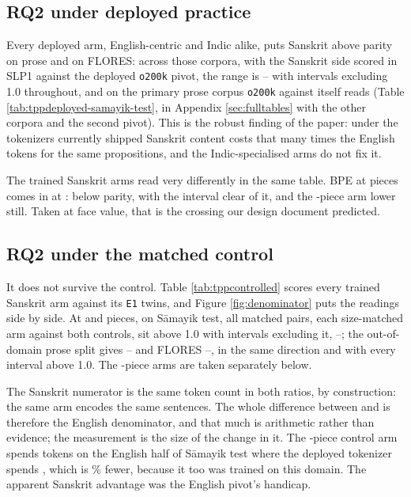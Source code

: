 \documentclass[11pt]{article}
\begin{document}
\subsection{RQ2 under deployed practice}
\label{sec:rq2-deployed}

Every deployed arm, English-centric and Indic alike, puts Sanskrit above parity on prose
and on FLORES: across those corpora, with the Sanskrit side scored in SLP1 against the
deployed \texttt{o200k} pivot, the range is \numDeployedLo--\numDeployedHi{} with intervals
excluding 1.0 throughout, and on the primary prose corpus \texttt{o200k} against itself
reads \numDeployedSamayikOTwoHundredK{} \numDeployedSamayikOTwoHundredKCi{}
(Table \ref{tab:tppdeployed-samayik-test}, in Appendix \ref{sec:fulltables} with the other
corpora and the second pivot). This is the robust finding of the paper: under the
tokenizers currently shipped Sanskrit content costs that many times the English tokens for
the same propositions, and the Indic-specialised arms do not fix it.

The trained Sanskrit arms read very differently in the same table. BPE at
\numVocabLarge{} pieces comes in at \numTppBpeSixtyFourDeployed{}
\numTppBpeSixtyFourDeployedCi{}: below parity, with the interval clear of it, and the
\numVocabHuge-piece arm lower still. Taken at face value, that is the crossing our design
document predicted.



\subsection{RQ2 under the matched control}
\label{sec:rq2-controlled}

It does not survive the control. Table \ref{tab:tppcontrolled} scores every trained
Sanskrit arm against its \texttt{E1} twins, and Figure \ref{fig:denominator} puts the
readings side by side. At \numVocabSmall{} and \numVocabLarge{} pieces, on S\=amayik test,
all \numControlledPairsSmall{} matched pairs, each size-matched arm against both controls,
sit above 1.0 with intervals excluding it,
\numTppControlledSamayikLo--\numTppControlledSamayikHi; the out-of-domain prose split gives
\numTppControlledOodLo--\numTppControlledOodHi{} and FLORES
\numTppControlledFloresLo--\numTppControlledFloresHi, in the same direction and with every
interval above 1.0. The \numVocabHuge-piece arms are taken separately below.

The Sanskrit numerator is the same token count in both ratios, by construction: the same
arm encodes the same sentences. The whole difference between \numTppBpeSixtyFourDeployed{}
and \numTppControlledBest{} is therefore the English denominator, and that much is
arithmetic rather than evidence; the measurement is the size of the change in it. The
\numVocabLarge-piece control arm spends \numEnTokensEOneBpe{} tokens on the English half of
S\=amayik test where the deployed tokenizer spends \numEnTokensOTwoHundredK, which is
\numEnTokenSavingPct\%{} fewer, because it too was trained on this domain. The apparent
Sanskrit advantage was the English pivot's handicap.
\end{document}
